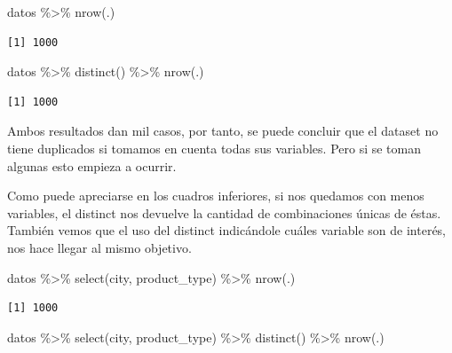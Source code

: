 \documentclass[
  letterpaper,
  DIV=11,
  numbers=noendperiod]{scrreprt}
\newenvironment{Shaded}{\begin{snugshade}}{\end{snugshade}}
\newcommand{\FunctionTok}[1]{\textcolor[rgb]{0.28,0.35,0.67}{#1}}
\newcommand{\NormalTok}[1]{\textcolor[rgb]{0.00,0.23,0.31}{#1}}
\newcommand{\SpecialCharTok}[1]{\textcolor[rgb]{0.37,0.37,0.37}{#1}}
\begin{document}
\begin{Shaded}
\begin{Highlighting}[]
\NormalTok{datos }\SpecialCharTok{\%\textgreater{}\%} 
  \FunctionTok{nrow}\NormalTok{(.)}
\end{Highlighting}
\end{Shaded}

\begin{verbatim}
[1] 1000
\end{verbatim}

\begin{Shaded}
\begin{Highlighting}[]
\NormalTok{datos }\SpecialCharTok{\%\textgreater{}\%} 
  \FunctionTok{distinct}\NormalTok{() }\SpecialCharTok{\%\textgreater{}\%} 
  \FunctionTok{nrow}\NormalTok{(.)}
\end{Highlighting}
\end{Shaded}

\begin{verbatim}
[1] 1000
\end{verbatim}

Ambos resultados dan mil casos, por tanto, se puede concluir que el
dataset no tiene duplicados si tomamos en cuenta todas sus variables.
Pero si se toman algunas esto empieza a ocurrir.

Como puede apreciarse en los cuadros inferiores, si nos quedamos con
menos variables, el distinct nos devuelve la cantidad de combinaciones
únicas de éstas. También vemos que el uso del distinct indicándole
cuáles variable son de interés, nos hace llegar al mismo objetivo.

\begin{Shaded}
\begin{Highlighting}[]
\NormalTok{datos }\SpecialCharTok{\%\textgreater{}\%}
  \FunctionTok{select}\NormalTok{(city, product\_type) }\SpecialCharTok{\%\textgreater{}\%} 
  \FunctionTok{nrow}\NormalTok{(.)}
\end{Highlighting}
\end{Shaded}

\begin{verbatim}
[1] 1000
\end{verbatim}

\begin{Shaded}
\begin{Highlighting}[]
\NormalTok{datos }\SpecialCharTok{\%\textgreater{}\%} 
  \FunctionTok{select}\NormalTok{(city, product\_type) }\SpecialCharTok{\%\textgreater{}\%} 
  \FunctionTok{distinct}\NormalTok{() }\SpecialCharTok{\%\textgreater{}\%} 
  \FunctionTok{nrow}\NormalTok{(.)}
\end{Highlighting}
\end{Shaded}
\end{document}
